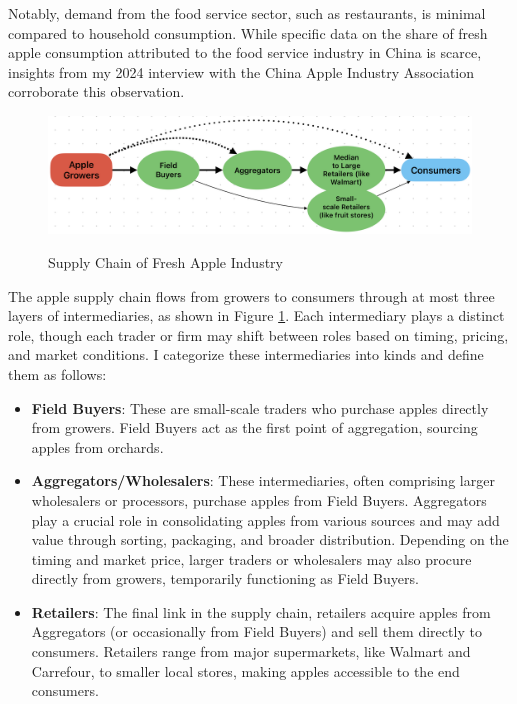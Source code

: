 Notably, demand from the food service sector, such as restaurants, is minimal compared to household consumption. While specific data on the share of fresh apple consumption attributed to the food service industry in China is scarce, insights from my 2024 interview with the China Apple Industry Association corroborate this observation.



\begin{figure}[hpt]
    \centering
        \caption{Supply Chain of Fresh Apple Industry}
    \includegraphics[width=\linewidth]{figures/Supply_Chain_flow.png}
    \label{fig: supply chain flow}
\end{figure}
The apple supply chain flows from growers to consumers through at most three layers of intermediaries, as shown in Figure \ref{fig: supply chain flow}. Each intermediary plays a distinct role, though each trader or firm may shift between roles based on timing, pricing, and market conditions. I categorize these intermediaries into kinds and define them as follows:

\begin{itemize}
    \item \textbf{Field Buyers}: These are small-scale traders who purchase apples directly from growers. Field Buyers act as the first point of aggregation, sourcing apples from orchards.
    
    \item \textbf{Aggregators/Wholesalers}: These intermediaries, often comprising larger wholesalers or processors, purchase apples from Field Buyers. Aggregators play a crucial role in consolidating apples from various sources and may add value through sorting, packaging, and broader distribution. Depending on the timing and market price, larger traders or wholesalers may also procure directly from growers, temporarily functioning as Field Buyers.
    
    \item \textbf{Retailers}: The final link in the supply chain, retailers acquire apples from Aggregators (or occasionally from Field Buyers) and sell them directly to consumers. Retailers range from major supermarkets, like Walmart and Carrefour, to smaller local stores, making apples accessible to the end consumers.
\end{itemize}

